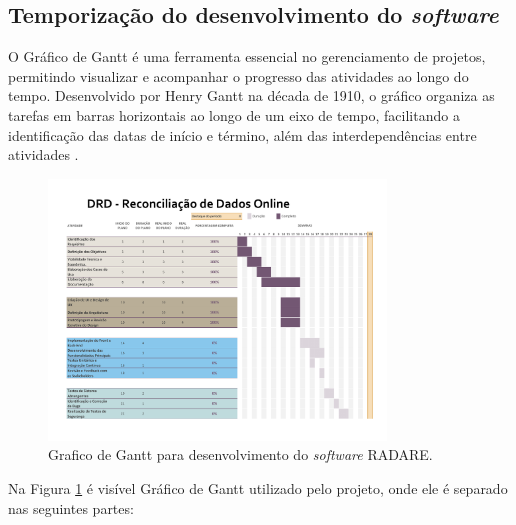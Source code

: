 \subsection{Temporização do desenvolvimento do \textit{software}}

O Gráfico de Gantt é uma ferramenta essencial no gerenciamento de projetos, permitindo visualizar e acompanhar o progresso das atividades ao longo do tempo. Desenvolvido por Henry Gantt na década de 1910, o gráfico organiza as tarefas em barras horizontais ao longo de um eixo de tempo, facilitando a identificação das datas de início e término, além das interdependências entre atividades \cite{ganttchart}.

\begin{figure}[h]
    \centering
    \includegraphics[width=0.8\textwidth]{figuras/DRD-Ganttt.pdf} %
    \caption{Grafico de Gantt para desenvolvimento do \textit{software} RADARE.}
    \label{fig:ganttChart}
\end{figure}    

Na Figura \ref{fig:ganttChart} é visível Gráfico de Gantt utilizado pelo projeto, onde ele é separado nas seguintes partes: 
    
